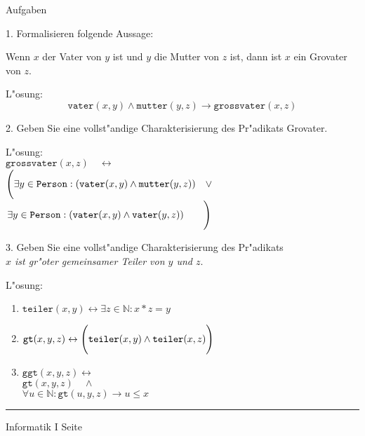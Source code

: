\begin{slide}{}
\normalsize
\begin{center}
Aufgaben
\end{center}
\vspace{0.5cm}

\footnotesize
1. Formalisieren folgende Aussage:

Wenn $x$ der Vater von $y$ ist und $y$ die Mutter von $z$ ist, dann ist $x$ ein
      Gro\3vater von $z$.

L"osung: 
$$ \mathtt{vater}(x, y) \wedge \mathtt{mutter}(y, z) \rightarrow \mathtt{grossvater}(x,z) $$


2. Geben Sie eine vollst"andige Charakterisierung des Pr"adikats Gro\3vater.

L"osung: \\[0.3cm]
\hspace*{0.3cm} $\mathtt{grossvater}(x,z) \quad \leftrightarrow$ \\
\hspace*{1.3cm} $\left( \rule{0pt}{18pt}\exists y \in \mathtt{Person}: (\mathtt{vater}(x,
  y) \wedge \mathtt{mutter}(y, z)) \quad \vee \right.$ \\
\hspace*{1.6cm} $\left. \rule{0pt}{18pt} \exists y \in \mathtt{Person}: (\mathtt{vater}(x,
  y) \wedge \mathtt{vater}(y, z)) \quad\quad
\right) $

3. Geben Sie eine vollst"andige Charakterisierung des Pr"adikats \\[0.1cm]
\hspace*{1.3cm} {\em $x$ ist gr"o\3ter gemeinsamer Teiler von $y$ und $z$}.

L"osung: 
\begin{enumerate}
\item $\mathtt{teiler}(x, y) \leftrightarrow \exists z \in \mathbb{N}: x * z = y$
\item $\mathtt{gt}(x, y, z) \leftrightarrow  \left(
       \rule{0pt}{16pt}  \mathtt{teiler}(x,y) \wedge \mathtt{teiler}(x,z) \right)$
\item $\mathtt{ggt}(x, y, z) \leftrightarrow $ \\[0.1cm]
\hspace*{1.3cm} $\mathtt{gt}(x, y, z) \quad \wedge$  \\
\hspace*{1.3cm} $\forall u \in \mathbb{N}: \mathtt{gt}(u,y,z) \rightarrow u \leq x$
\end{enumerate}


\vspace*{\fill}
\tiny \addtocounter{mypage}{1}
\rule{15cm}{1mm}
Informatik I  \hspace*{\fill} Seite 
\end{slide}


